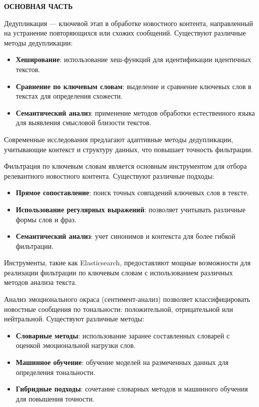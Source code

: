 \newpage

{\centering
\normal
\textbf{ОСНОВНАЯ ЧАСТЬ}\par
}


\label{subsec:anal11}

\label{subsubsec:anal111}
Дедупликация — ключевой этап в обработке новостного контента, направленный на устранение повторяющихся или схожих сообщений.
Существуют различные методы дедупликации:
\begin{itemize}
    \item \textbf{Хеширование}: использование хеш-функций для идентификации идентичных текстов.
    \item \textbf{Сравнение по ключевым словам}: выделение и сравнение ключевых слов в текстах для определения схожести.
    \item \textbf{Семантический анализ}: применение методов обработки естественного языка для выявления смысловой близости текстов.
\end{itemize}

Современные исследования предлагают адаптивные методы дедупликации, учитывающие контекст и структуру данных, что повышает точность фильтрации.

\label{subsubsec:anal112}
Фильтрация по ключевым словам является основным инструментом для отбора релевантного новостного контента.
Существуют различные подходы:
\begin{itemize}
    \item \textbf{Прямое сопоставление}: поиск точных совпадений ключевых слов в тексте.
    \item \textbf{Использование регулярных выражений}: позволяет учитывать различные формы слов и фраз.
    \item \textbf{Семантический анализ}: учет синонимов и контекста для более гибкой фильтрации.
\end{itemize}

Инструменты, такие как Elasticsearch, предоставляют мощные возможности для реализации фильтрации по ключевым словам с использованием различных методов анализа текста.

\label{subsubsec:anal113}
Анализ эмоционального окраса (сентимент-анализ) позволяет классифицировать новостные сообщения по тональности: положительной, отрицательной или нейтральной.
Существуют различные методы:
\begin{itemize}
    \item \textbf{Словарные методы}: использование заранее составленных словарей с оценкой эмоциональной нагрузки слов.
    \item \textbf{Машинное обучение}: обучение моделей на размеченных данных для определения тональности.
    \item \textbf{Гибридные подходы}: сочетание словарных методов и машинного обучения для повышения точности.
\end{itemize}

